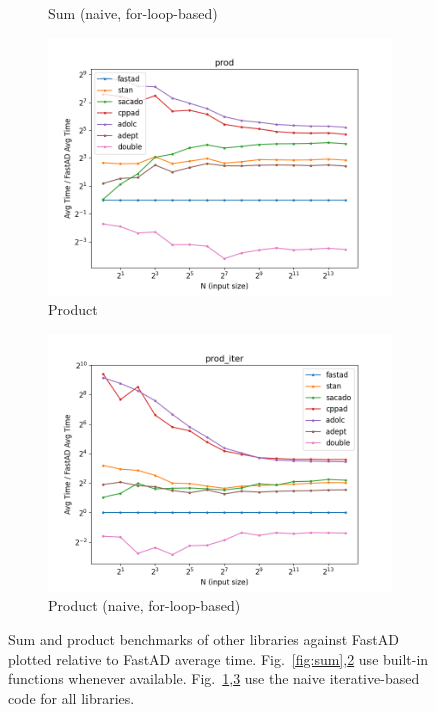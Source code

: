 \begin{figure}[t]
\begin{subfigure}[b]{0.475\textwidth}
        \caption{Sum (naive, for-loop-based)}\label{fig:sum_iter}
    \end{subfigure}
    \baselineskip%
    \begin{subfigure}[b]{0.475\textwidth}
        \centering
        \includegraphics[width=\textwidth]{figs/prod_fig.png}
        \caption{Product}\label{fig:prod}
    \end{subfigure}
    \hfill
    \begin{subfigure}[b]{0.475\textwidth}
        \centering
        \includegraphics[width=\textwidth]{figs/prod_iter_fig.png}
        \caption{Product (naive, for-loop-based)}\label{fig:prod_iter}
    \end{subfigure}
    \caption{%
        Sum and product benchmarks of other libraries against FastAD 
        plotted relative to FastAD average time.
        Fig.~\ref{fig:sum},\ref{fig:prod} use built-in functions whenever available.
        Fig.~\ref{fig:sum_iter},\ref{fig:prod_iter} use the naive iterative-based code for all libraries.
    }\label{fig:sum_prod}
\end{figure}

